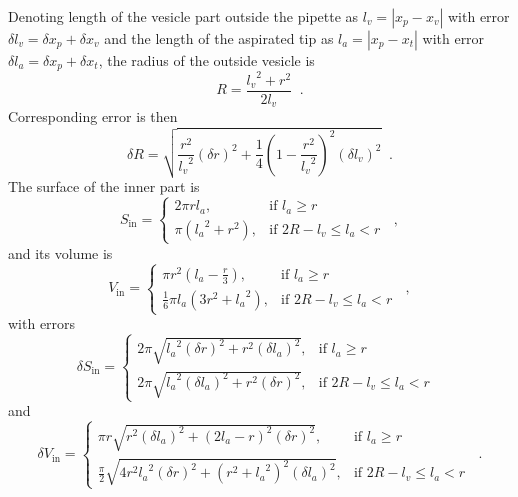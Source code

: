Denoting length of the vesicle part outside the pipette as $l_v = \left|x_p-x_v\right|$ with error $\delta l_v = \delta x_p + \delta x_v$ and the length of the aspirated tip as $l_a = \left|x_p-x_t\right|$ with error $\delta l_a = \delta x_p + \delta x_t$, the radius of the outside vesicle is
\begin{equation*}
R = \frac{{l_v}^2 + r^2}{2l_v}\;\;.
\end{equation*}
Corresponding error is then
\begin{equation*}
 \delta R = \sqrt{\frac{r^2}{{l_v}^2} \left(\delta r\right)^2 + \frac{1}{4}\left(1-\frac{r^2}{{l_v}^2}\right)^2 \left( \delta l_v\right) ^2}\;\;.
\end{equation*}
The surface of the inner part is
\begin{equation*}
S_\text{in} = \left\{
\begin{array}{ll}
	2\pi rl_a,& \text{if } l_a \geq r\\
	\pi\left({l_a}^2+r^2\right),&\text{if } 2R-l_v \leq l_a < r
\end{array}
\right.\;\;,
\end{equation*}
and its volume is
\begin{equation*}
V_{\text{in}} = \left\{
\begin{array}{ll}
	\pi r^2\left(l_a-\frac{r}{3}\right), & \text{if } l_a \geq r\\
	\frac{1}{6}\pi l_a\left(3r^2+{l_a}^2\right),&\text{if } 2R-l_v \leq l_a < r
\end{array}
\right.\;\;,
\end{equation*}
with errors
\begin{equation*}
 \delta S_\text{in} = \left\{
 \begin{array}{ll}
	2\pi \sqrt{{l_a}^2\left(\delta r\right)^2 + r^2\left(\delta l_a\right)^2},& \text{if } l_a \geq r\\
	2\pi \sqrt{{l_a}^2\left(\delta l_a\right)^2 + r^2\left(\delta r\right)^2},&\text{if } 2R-l_v \leq l_a < r
\end{array}
\right.\;\;
\end{equation*}
and
\begin{equation*}
\delta V_{\text{in}} = \left\{
\begin{array}{ll}
	\pi r \sqrt{r^2\left(\delta l_a\right)^2 + \left(2l_a-r\right)^2 \left(\delta r\right)^2}, & \text{if } l_a \geq r\\
	\frac{\pi}{2} \sqrt{4 r^2 {l_a}^2\left(\delta r\right)^2 + \left(r^2+{l_a}^2\right)^2 \left(\delta l_a\right)^2}, & \text{if } 2R-l_v \leq l_a < r
\end{array}
\right.\;\;.
\end{equation*}
